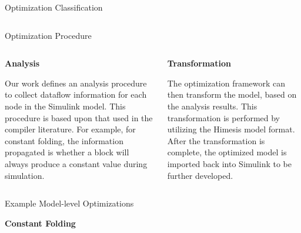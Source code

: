 \documentclass[final,hyperref={pdfpagelabels=false}]{beamer}
\begin{document}
\begin{frame}{}
\begin{block}{Optimization Classification}
\begin{columns}[t,totalwidth=\linewidth]
                  \end{columns}
            \end{block}
	
        \begin{block}{Optimization Procedure}
        \vspace{-1.5cm}
        \begin{columns}[t,totalwidth=\linewidth]
         \begin{column}{.485\linewidth}
         \vspace{-.8cm}
         \small
       \begin{center}\textbf{Analysis}\end{center}
       \footnotesize
       Our work defines an analysis procedure to collect dataflow information for each node in the Simulink model. This procedure is based upon that used in the compiler literature. For example, for constant folding, the information propagated is whether a block will always produce a constant value during simulation.
       \end{column}
       \begin{column}{.485\linewidth}
       \vspace{-.8cm}
       \small
      \begin{center}\textbf{Transformation}\end{center}
        \footnotesize
        The optimization framework can then transform the model, based on the analysis results. This transformation is performed by utilizing the Himesis model format. After the transformation is complete, the optimized model is imported back into Simulink to be further developed.
        \end{column}
              \end{columns}
        \end{block}
      
      \vspace{-1.5cm}
    \begin{columns}[t,totalwidth=\linewidth]
    \centering
      \begin{column}{.585\linewidth}
        \begin{block}{Example Model-level Optimizations}
         \vspace{-.8cm}
        \small
        \begin{center}\textbf{Constant Folding}\end{center}
        \vspace{-0.3cm}
        \begin{columns}[c,totalwidth=\linewidth]
        \begin{column}{.485\linewidth}
        \begin{center}
        

\end{center}
\end{column}
\end{columns}
\end{block}
\end{column}
\end{columns}
\end{frame}
\end{document}

